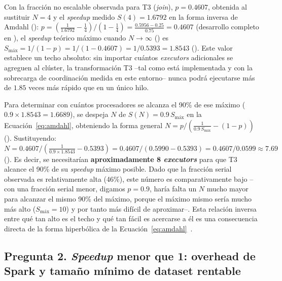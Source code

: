 \documentclass[11pt,a4paper]{article}
\begin{document}
    Con la fracción no escalable observada para T3 (\emph{join}), $p=0.4607$, obtenida al sustituir
    $N=4$ y el \emph{speedup} medido $S(4)=1.6792$ en la forma inversa de Amdahl
    (): $p = \left(\frac{1}{1.6792} - \frac{1}{4}\right) / \left(1 -
                                                                                   \frac{1}{4}\right) = \frac{0.5956-0.25}{0.75} = 0.4607$ (desarrollo completo en
    ), el \emph{speedup} teórico máximo cuando $N\to\infty$
    () es $S_{\text{máx}} = 1/(1-p) = 1/(1-0.4607) = 1/0.5393 = 1.8543$
    (). Este valor establece un techo absoluto: sin importar cuántos
    \emph{executors} adicionales se agreguen al clúster, la transformación T3 --tal como está
    implementada y con la sobrecarga de coordinación medida en este entorno-- nunca podrá ejecutarse
    más de $1.85$ veces más rápido que en un único hilo.

    Para determinar con cuántos procesadores se alcanza el 90\% de ese máximo
    ($0.9 \times 1.8543 = 1.6689$), se despeja $N$ de $S(N) = 0.9\,S_{\text{máx}}$ en la
    Ecuación~\eqref{eq:amdahl}, obteniendo la forma general
    $N = p / \left(\frac{1}{0.9\,S_{\text{máx}}} - (1-p)\right)$ ().
    Sustituyendo: $N = 0.4607 / \left(\frac{1}{0.9 \times 1.8543} - 0.5393\right) = 0.4607 /
    (0.5990 - 0.5393) = 0.4607/0.0599 \approx 7.69$ (). Es decir, se
    necesitarían \textbf{aproximadamente 8 \emph{executors}} para que T3 alcance el 90\% de su
    \emph{speedup} máximo posible. Dado que la fracción serial observada es relativamente alta
    (46\%), este número es comparativamente bajo --con una fracción serial menor, digamos $p=0.9$,
    haría falta un $N$ mucho mayor para alcanzar el mismo 90\% del máximo, porque el máximo mismo
    sería mucho más alto ($S_{\text{máx}}=10$) y por tanto más difícil de aproximar--. Esta relación
    inversa entre qué tan alto es el techo y qué tan fácil es acercarse a él es una consecuencia
    directa de la forma hiperbólica de la Ecuación~\eqref{eq:amdahl}~\autocite{amdahl1967}.

    \subsection*{Pregunta 2. \texorpdfstring{\emph{Speedup}}{Speedup} menor que 1: overhead de Spark y tamaño mínimo de dataset rentable}
\end{document}
